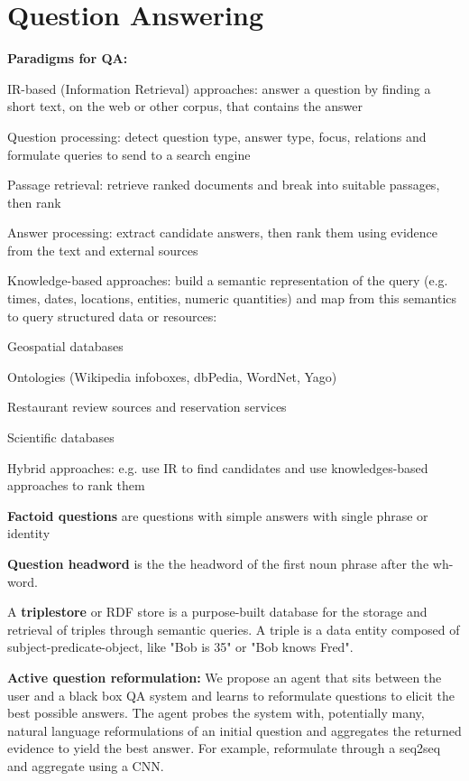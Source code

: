 \documentclass[12pt]{article}
\begin{document}
\section{Question Answering}
\textbf{Paradigms for QA:}
\ulb
\item IR-based (Information Retrieval) approaches: answer a question by finding a short text, on the web or other corpus, that contains the answer
\olb
\item Question processing: detect question type, answer type, focus, relations and formulate queries to send to a search engine
\item Passage retrieval: retrieve ranked documents and break into suitable passages, then rank
\item Answer processing: extract candidate answers, then rank them using evidence from the text and external sources
\ole
\item Knowledge-based approaches: build a semantic representation of the query (e.g. times, dates, locations, entities, numeric quantities) and map from this semantics to query structured data or resources:
\ulb
\item Geospatial databases
\item Ontologies (Wikipedia infoboxes, dbPedia, WordNet, Yago)
\item Restaurant review sources and reservation services
\item Scientific databases
\ule
\item Hybrid approaches: e.g. use IR to find candidates and use knowledges-based approaches to rank them
\ule
\par \textbf{Factoid questions} are questions with simple answers with single phrase or identity
\par \textbf{Question headword} is the the headword of the first noun phrase after the wh-word.
\par A \textbf{triplestore} or RDF store is a purpose-built database for the storage and retrieval of triples through semantic queries. A triple is a data entity composed of subject-predicate-object, like "Bob is 35" or "Bob knows Fred".
\par \textbf{Active question reformulation:} We propose an agent that sits between the user and a black box QA system and learns to reformulate questions to elicit the best possible answers. The agent probes the system with, potentially many, natural language reformulations of an initial question and aggregates the returned evidence to yield the best answer. For example, reformulate through a seq2seq and aggregate using a CNN.
\end{document}
